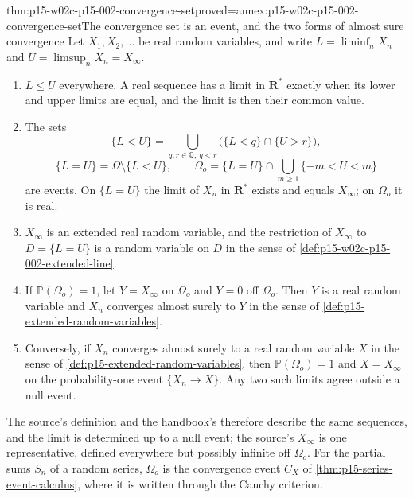 \begin{hbtheorem}{thm:p15-w02c-p15-002-convergence-set}{proved=annex:p15-w02c-p15-002-convergence-set}{The convergence set is an event, and the two forms of almost sure convergence}
Let \(X_1,X_2,\ldots\) be real random variables, and write
\(L=\liminf_nX_n\) and \(U=\limsup_nX_n=X_\infty\).
\begin{enumerate}
\item \(L\leq U\) everywhere. A real sequence has a limit in
      \(\mathbf R^*\) exactly when its lower and upper limits are equal,
      and the limit is then their common value.
\item The sets
      \[
       \{L<U\}=\bigcup_{q,r\in\mathbb Q,\ q<r}\bigl(\{L<q\}\cap\{U>r\}\bigr),
      \]
      \[
       \{L=U\}=\Omega\setminus\{L<U\},\qquad
       \Omega_o=\{L=U\}\cap\bigcup_{m\geq1}\{-m<U<m\}
      \]
      are events. On \(\{L=U\}\) the limit of \(X_n\) in \(\mathbf R^*\)
      exists and equals \(X_\infty\); on \(\Omega_o\) it is real.
\item \(X_\infty\) is an extended real random variable, and the
      restriction of \(X_\infty\) to \(D=\{L=U\}\) is a random variable on
      \(D\) in the sense of \cref{def:p15-w02c-p15-002-extended-line}.
\item If \(\mathbb P(\Omega_o)=1\), let \(Y=X_\infty\) on \(\Omega_o\) and
      \(Y=0\) off \(\Omega_o\). Then \(Y\) is a real random variable and
      \(X_n\) converges almost surely to \(Y\) in the sense of
      \cref{def:p15-extended-random-variables}.
\item Conversely, if \(X_n\) converges almost surely to a real random
      variable \(X\) in the sense of
      \cref{def:p15-extended-random-variables}, then
      \(\mathbb P(\Omega_o)=1\) and \(X=X_\infty\) on the probability-one
      event \(\{X_n\to X\}\). Any two such limits agree outside a null
      event.
\end{enumerate}
\end{hbtheorem}

The source's definition and the handbook's therefore describe the same
sequences, and the limit is determined up to a null event; the source's
\(X_\infty\) is one representative, defined everywhere but possibly
infinite off \(\Omega_o\). For the partial sums \(S_n\) of a random series,
\(\Omega_o\) is the convergence event \(C_X\) of
\cref{thm:p15-series-event-calculus}, where it is written through the
Cauchy criterion.

